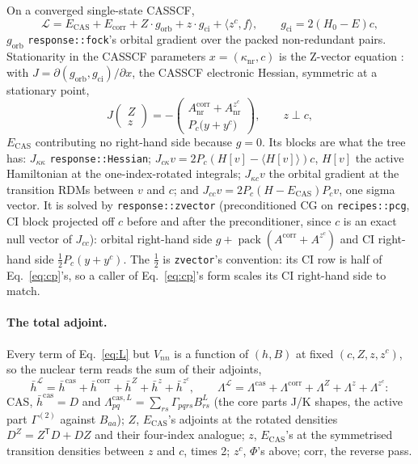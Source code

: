 \documentclass[11pt]{article}
\newcommand{\code}[1]{\texttt{#1}}
\newcommand{\G}[1]{\Gamma^{(#1)}}
\newcommand{\Ecas}{E_{\mathrm{CAS}}}
\newcommand{\Ecorr}{E_{\mathrm{corr}}}
\newcommand{\hb}{\bar h}
\newcommand{\Lb}{\Lambda}
\newcommand{\T}{\mathsf T}
\begin{document}
On a converged single-state CASSCF,
\begin{equation}
  \mathcal L = \Ecas + \Ecorr + Z\cdot g_{\mathrm{orb}} + z\cdot g_{\mathrm{ci}} + \langle z^c, f\rangle,
  \qquad g_{\mathrm{ci}} = 2(H_0 - E)c,
  \label{eq:L}
\end{equation}
$g_{\mathrm{orb}}$ \code{response::fock}'s orbital gradient over the packed
non-redundant pairs. Stationarity in the CASSCF parameters
$x = (\kappa_{\mathrm{nr}}, c)$ is the Z-vector equation \cite{handy1984}:
with $J = \partial(g_{\mathrm{orb}}, g_{\mathrm{ci}})/\partial x$, the CASSCF
electronic Hessian, symmetric at a stationary point,
\begin{equation}
  J\begin{pmatrix} Z\\ z\end{pmatrix} = -\begin{pmatrix}
      A^{\mathrm{corr}}_{\mathrm{nr}} + A^{z^c}_{\mathrm{nr}}\\[2pt]
      P_c\bigl(y + y^c\bigr)\end{pmatrix},
  \qquad z\perp c,
  \label{eq:cp}
\end{equation}
$\Ecas$ contributing no right-hand side because $g = 0$. Its blocks are what
the tree has: $J_{\kappa\kappa}$ \code{response::Hessian};
$J_{c\kappa}v = 2P_c(H[v] - \langle H[v]\rangle)c$, $H[v]$ the active
Hamiltonian at the one-index-rotated integrals; $J_{\kappa c}v$ the orbital
gradient at the transition RDMs between $v$ and $c$; and
$J_{cc}v = 2P_c(H - \Ecas)P_cv$, one sigma vector. It is solved by
\code{response::zvector} (preconditioned CG on \code{recipes::pcg}, CI block
projected off $c$ before and after the preconditioner, since $c$ is an exact
null vector of $J_{cc}$): orbital right-hand side
$g + \operatorname{pack}(A^{\mathrm{corr}} + A^{z^c})$ and CI right-hand side
$\tfrac12 P_c(y + y^c)$. The $\tfrac12$ is \code{zvector}'s convention: its
CI row is half of Eq.~\eqref{eq:cp}'s, so a caller of Eq.~\eqref{eq:cp}'s
form scales its CI right-hand side to match.

\paragraph{The total adjoint.} Every term of Eq.~\eqref{eq:L} but $V_{nn}$ is
a function of $(h, B)$ at fixed $(c, Z, z, z^c)$, so the nuclear term reads
the sum of their adjoints,
\begin{equation}
  \hb^{\mathcal L} = \hb^{\mathrm{cas}} + \hb^{\mathrm{corr}} + \hb^{Z} + \hb^{z} + \hb^{z^c},\qquad
  \Lb^{\mathcal L} = \Lb^{\mathrm{cas}} + \Lb^{\mathrm{corr}} + \Lb^{Z} + \Lb^{z} + \Lb^{z^c}:
  \label{eq:total}
\end{equation}
CAS, $\hb^{\mathrm{cas}} = D$ and $\Lb^{\mathrm{cas},L}_{pq} =
\sum_{rs}\Gamma_{pqrs}B^L_{rs}$ (the core parts J/K shapes, the active part
$\G2$ against $B_{aa}$); $Z$, $\Ecas$'s adjoints at the rotated densities
$D^Z = Z^\T D + DZ$ and their four-index analogue; $z$, $\Ecas$'s at the
symmetrised transition densities between $z$ and $c$, times 2; $z^c$, $\Phi$'s
above; corr, the reverse pass.
\end{document}
